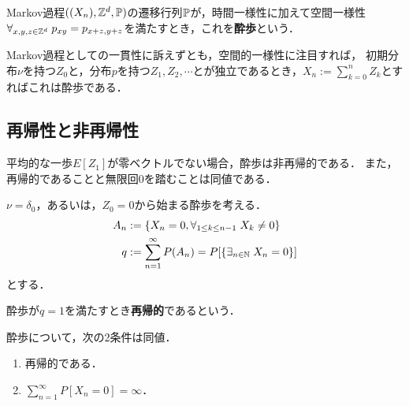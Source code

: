 \documentclass[uplatex,dvipdfmx]{jsreport}
\begin{document}
\begin{definition}
    Markov過程$((X_n),\mathbb{Z}^d,\mathbb{P})$の遷移行列$\mathbb{P}$が，時間一様性に加えて空間一様性$\forall_{x,y,z\in\mathbb{Z}^d}\;p_{xy}=p_{x+z,y+z}$を満たすとき，これを\textbf{酔歩}という．
\end{definition}

\begin{discussion}[加法過程としての構成]\label{discussion-random-walk}
    Markov過程としての一貫性に訴えずとも，空間的一様性に注目すれば，
    初期分布$\nu$を持つ$Z_0$と，分布$p$を持つ$Z_1,Z_2,\cdots$とが独立であるとき，$X_n:=\sum^n_{k=0}Z_k$とすればこれは酔歩である．
\end{discussion}

\subsection{再帰性と非再帰性}

\begin{tcolorbox}[colframe=ForestGreen, colback=ForestGreen!10!white,breakable,colbacktitle=ForestGreen!40!white,coltitle=black,fonttitle=\bfseries\sffamily,
title=]
    平均的な一歩$E[Z_1]$が零ベクトルでない場合，酔歩は非再帰的である．
    また，再帰的であることと無限回$0$を踏むことは同値である．
\end{tcolorbox}

\begin{notation}
    $\nu=\delta_0$，あるいは，$Z_0=0$から始まる酔歩を考える．
    \begin{align*}
        A_n&:=\left\{X_n=0,\forall_{1\le k\le n-1}\;X_k\ne0\right\}\\
        q&:=\sum^\infty_{n=1}P(A_n)=P[\left\{\exists_{n\in\mathbb{N}}\;X_n=0\right\}]
    \end{align*}
    とする．
\end{notation}

\begin{definition}[recurrent]
    酔歩が$q=1$を満たすとき\textbf{再帰的}であるという．
\end{definition}

\begin{lemma}
    酔歩について，次の2条件は同値．
    \begin{enumerate}
        \item 再帰的である．
        \item $\sum^\infty_{n=1}P[X_n=0]=\infty$．
    \end{enumerate}
\end{lemma}
\end{document}
